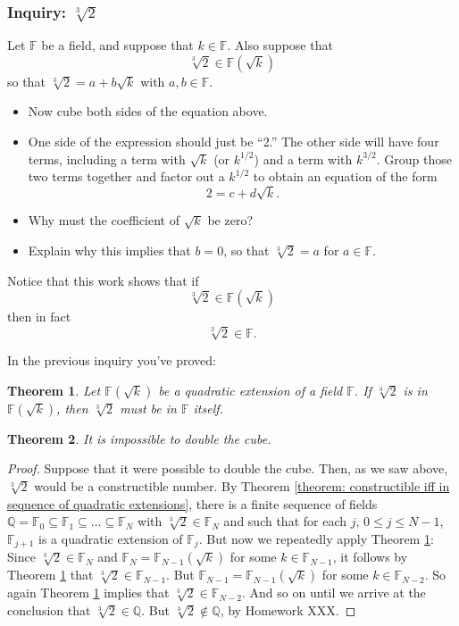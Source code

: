 \documentclass[11pt]{article}
\newenvironment{task}
	{\begin{mdframed}[linecolor=lightgray, linewidth=3pt]\raggedright}
	{\end{mdframed}}
\renewcommand\subset\subseteq
\newtheorem{theorem}{Theorem}[section]
\theoremstyle{definition}
\begin{document}
\subsubsection{Inquiry: $\sqrt[3]{2}$}
\begin{task}
  Let $\mathbb{F}$ be a field, and suppose that $k\in\mathbb{F}$. Also suppose that
  \[ \sqrt[3]{2} \in \mathbb{F}(\sqrt{k})\]
  so that $\sqrt[3]{2} = a + b\sqrt{k}$ with $a,b \in \mathbb{F}$.
  \begin{itemize}
    \item Now cube both sides of the equation above.
    \item One side of the expression should just be ``2.'' The other side will have four terms, including a term with $\sqrt{k}$ (or $k^{1/2}$) and
      a term with $k^{3/2}$. Group those two terms together and factor out a $k^{1/2}$ to obtain an equation of the form
      \[ 2 = c + d\sqrt{k}.\]
    \item Why must the coefficient of $\sqrt{k}$ be zero?
    \item Explain why this implies that $b=0$, so that $\sqrt[3]{2} = a$ for $a\in \mathbb{F}$.
  \end{itemize}
  Notice that this work shows that if
  \[ \sqrt[3]{2} \in \mathbb{F}(\sqrt{k})\]
  then in fact
  \[ \sqrt[3]{2} \in \mathbb{F}.\]
\end{task}

In the previous inquiry you've proved:

\begin{theorem}
  Let $\mathbb{F}(\sqrt{k})$ be a quadratic extension of a field $\mathbb{F}$. If $\sqrt[3]{2}$ is in $\mathbb{F}(\sqrt{k})$, then $\sqrt[3]{2}$ 
  must be in $\mathbb{F}$ itself.
  \label{theorem: cube root of 2}
\end{theorem}

\begin{theorem}
  It is impossible to double the cube.
  \label{theorem: can't double cube}
\end{theorem}
\begin{proof}
  Suppose that it were possible to double the cube. Then, as we saw above, $\sqrt[3]{2}$ would be a constructible number. By 
  Theorem \ref{theorem: constructible iff in sequence of quadratic extensions}, there is a finite sequence of fields 
  $\mathbb{Q} = \mathbb{F}_0 \subset \mathbb{F}_1\subset \dots \subset \mathbb{F}_N$ with
  $\sqrt[3]{2}\in\mathbb{F}_N$ and such that for each $j$, $0\leq j \leq N-1$, $\mathbb{F}_{j+1}$ is a quadratic extension of $\mathbb{F}_j$.
  But now we repeatedly apply Theorem \ref{theorem: cube root of 2}: Since $\sqrt[3]{2}\in\mathbb{F}_N$ and $\mathbb{F}_N = \mathbb{F}_{N-1}(\sqrt{k})$
  for some $k\in\mathbb{F}_{N-1}$, it follows by Theorem \ref{theorem: cube root of 2} that $\sqrt[3]{2} \in\mathbb{F}_{N-1}$. But
  $\mathbb{F}_{N-1} = \mathbb{F}_{N-1}(\sqrt{k})$ for some $k\in\mathbb{F}_{N-2}$. So again Theorem \ref{theorem: cube root of 2} implies that
  $\sqrt[3]{2}\in\mathbb{F}_{N-2}$. And so on until we arrive at the conclusion that $\sqrt[3]{2}\in\mathbb{Q}$. But $\sqrt[3]{2}\not\in\mathbb{Q}$, by
  Homework XXX.
\end{proof}
\
\end{document}
